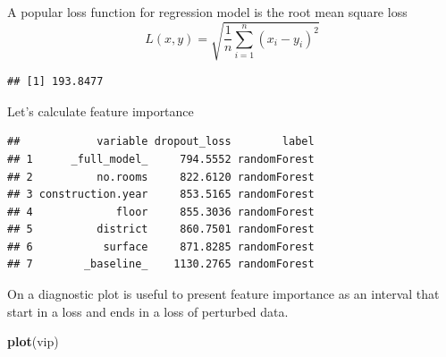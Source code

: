 \documentclass[12pt,]{krantz}
\newenvironment{Shaded}{\begin{snugshade}}{\end{snugshade}}
\newcommand{\DataTypeTok}[1]{\textcolor[rgb]{0.13,0.29,0.53}{#1}}
\newcommand{\DecValTok}[1]{\textcolor[rgb]{0.00,0.00,0.81}{#1}}
\newcommand{\KeywordTok}[1]{\textcolor[rgb]{0.13,0.29,0.53}{\textbf{#1}}}
\newcommand{\NormalTok}[1]{#1}
\newcommand{\OperatorTok}[1]{\textcolor[rgb]{0.81,0.36,0.00}{\textbf{#1}}}
\newcommand{\StringTok}[1]{\textcolor[rgb]{0.31,0.60,0.02}{#1}}
\theoremstyle{definition}
\theoremstyle{definition}
\theoremstyle{definition}
\theoremstyle{remark}
\begin{document}
A popular loss function for regression model is the root mean square
loss \[
  L(x, y) = \sqrt{\frac1n \sum_{i=1}^n (x_i - y_i)^2}
\]

\begin{Shaded}
\end{Shaded}

\begin{verbatim}
## [1] 193.8477
\end{verbatim}

Let's calculate feature importance

\begin{Shaded}
\end{Shaded}

\begin{verbatim}
##            variable dropout_loss        label
## 1      _full_model_     794.5552 randomForest
## 2          no.rooms     822.6120 randomForest
## 3 construction.year     853.5165 randomForest
## 4             floor     855.3036 randomForest
## 5          district     860.7501 randomForest
## 6           surface     871.8285 randomForest
## 7        _baseline_    1130.2765 randomForest
\end{verbatim}

On a diagnostic plot is useful to present feature importance as an
interval that start in a loss and ends in a loss of perturbed data.

\begin{Shaded}
\begin{Highlighting}[]
\KeywordTok{plot}\NormalTok{(vip)}
\end{Highlighting}
\end{Shaded}
\end{document}
